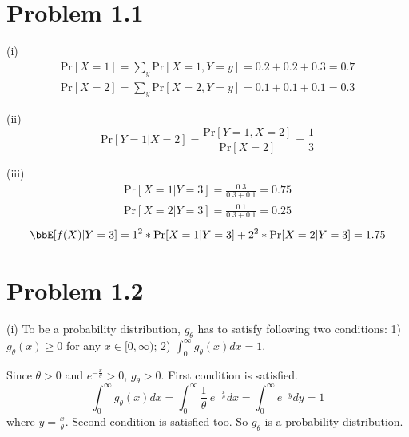 \documentclass[twoside,11pt]{homework}
\date{\today} %
\begin{document}
\maketitle

\section*{Problem 1.1}
(i) %
%
\begin{equation}
\begin{split}
\mathrm{Pr}[X=1] = \sum_y \mathrm{Pr}[X=1, Y=y] = 0.2 + 0.2 + 0.3 = 0.7 \\
\mathrm{Pr}[X=2] = \sum_y \mathrm{Pr}[X=2, Y=y] = 0.1 + 0.1 + 0.1 = 0.3
\end{split}
\end{equation}
%

\noindent (ii) 
%
\begin{equation}
\mathrm{Pr}[Y=1|X=2] = \frac{\mathrm{Pr}[Y=1, X=2] }{\mathrm{Pr}[X=2] } = \frac{1}{3}
\end{equation}
%

\noindent (iii) 
\begin{equation}
\begin{split}
\mathrm{Pr}[X=1|Y=3] = \frac{0.3}{0.3+0.1} = 0.75\\
\mathrm{Pr}[X=2|Y=3] = \frac{0.1}{0.3+0.1} = 0.25
\end{split}
\end{equation}
%
\begin{equation}
\bbE[f(X)|Y=3] = 1^2 * \mathrm{Pr}[X=1|Y=3] + 2^2 * \mathrm{Pr}[X=2|Y=3] = 1.75
\end{equation}
%

\section*{Problem 1.2}
(i) To be a probability distribution, $g_\theta$ has to satisfy following two conditions:
1) $g_\theta(x) \geq 0$ for any $x \in [0, \infty)$;
2) $\int_0^{\infty} g_{\theta} (x) dx = 1$.

Since $\theta > 0$ and $e^{-\frac{x}{\theta}} > 0$, $g_\theta > 0$. 
First condition is satisfied.
\begin{equation}
\int_0^{\infty} g_{\theta} (x) dx = \int_0^{\infty}\frac{1}{\theta}\ e^{-\frac{x}{\theta}} dx
= \int_0^{\infty} e^{-y} dy
= 1 
\end{equation}
%
where $y = \frac{x}{\theta}$. Second condition is satisfied too. So $g_\theta$ is a probability distribution.
\end{document}
